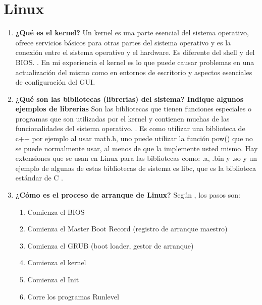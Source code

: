 \documentclass[stu, 12pt, letterpaper, donotrepeattitle, floatsintext, natbib, helv]{apa7}
\begin{document}
\section*{Linux}
{}
\begin{enumerate}
    \item \textbf{¿Qué es el kernel?}
    Un kernel es una parte esencial del sistema operativo, ofrece servicios básicos para otras partes del sistema operativo y es la conexión entre el sistema operativo y el hardware. Es diferente del shell y del BIOS. . En mi experiencia el kernel es lo que puede causar problemas en una actualización del mismo como en entornos de escritorio y aspectos esenciales de configuración del GUI.

    \item \textbf{¿Qué son las bibliotecas (librerias) del sistema? Indique algunos ejemplos de librerias}
    Son las bibliotecas que tienen funciones especiales o programas que son utilizadas por el kernel y contienen muchas de las funcionalidades del sistema operativo. \cite{systemLibraries}. Es como utilizar una biblioteca de c++ por ejemplo al usar math.h, uno puede utilizar la función pow() que no se puede normalmente usar, al menos de que la implemente usted mismo. Hay extensiones que se usan en Linux para las bibliotecas como: .a, .bin y .so y un ejemplo de algunas de estas bibliotecas de sistema es libc, que es la biblioteca estándar de C .
    
    \item \textbf{¿Cómo es el proceso de arranque de Linux?}
    Según , los pasos son:
    \begin{enumerate}
        \item Comienza el BIOS
        \item Comienza el Master Boot Record (registro de arranque maestro)
        \item Comienza el GRUB (boot loader, gestor de arranque)
        \item Comienza el kernel
        \item Comienza el Init
        \item Corre los programas Runlevel
    \end{enumerate}
    

\end{enumerate}
\end{document}
